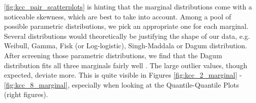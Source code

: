
\autoref{fig:kcc_pair_scatterplots} is hinting that the marginal distributions come with a noticeable skewness, which are best to take into account. Among a pool of possible parametric distributions, we pick an appropriate one for each marginal. Several distributions would theoretically be justifying the shape of our data, e.g. Weibull, Gamma, Fisk (or Log-logistic), Singh-Maddala or Dagum distribution. After screening those parametric distributions, we find that the Dagum distribution fits all three marginals fairly well \citep{dagum1975model}. The large outlier values, though expected, deviate more. This is quite visible in Figures \ref{fig:kcc_2_marginal} - \ref{fig:kcc_8_marginal}, especially when looking at the Quantile-Quantile Plots (right figures).



